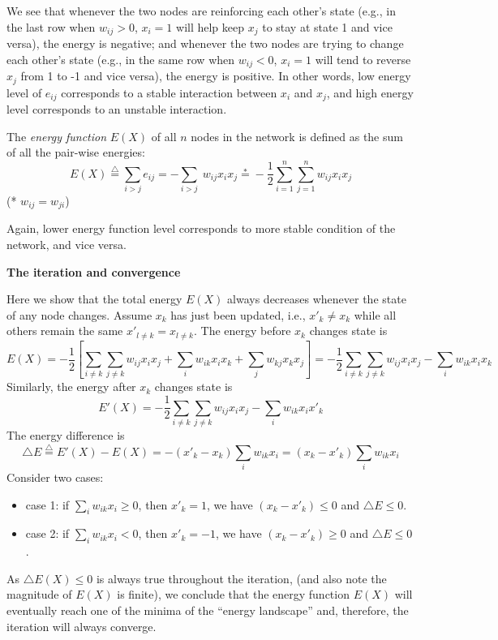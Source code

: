 We see that whenever the two nodes are reinforcing each other's state (e.g.,
in the last row when $w_{ij}>0$, $x_i=1$ will help keep $x_j$ to stay at state
1 and vice versa), the energy is negative; and whenever the two nodes are 
trying to change each other's state (e.g., in the same row when $w_{ij}<0$, 
$x_i=1$ will tend to reverse $x_j$ from 1 to -1 and vice versa), the energy is
positive. In other words, low energy level of $e_{ij}$ corresponds to a stable
interaction between $x_i$ and $x_j$, and high energy level corresponds to an
unstable interaction.

The {\em energy function} $E(X)$ of all $n$ nodes in the network is defined as
the sum of all the pair-wise energies:
\[
E(X) \stackrel{\triangle}{=} \sum_{i>j} e_{ij}=-\sum_{i>j} \; w_{ij}x_ix_j
	 \stackrel{*}{=} -\frac{1}{2}\sum_{i=1}^{n} \sum_{j=1}^{n} w_{ij} x_i x_j 
\]
(* $w_{ij}=w_{ji}$)

Again, lower energy function level corresponds to more stable condition of 
the network, and vice versa.

{\bf The iteration and convergence}

Here we show that the total energy $E(X)$ always decreases whenever the state 
of any node changes. Assume $x_k$ has just been updated, i.e., $x'_k \neq x_k$ 
while all others remain the same $x'_{l \neq k} = x_{l \neq k}$. The energy 
before $x_k$ changes state is
\[ 
E(X)	= -\frac{1}{2}[ \sum_{i\neq k}\sum_{j\neq k}w_{ij}x_ix_j
	+ \sum_i w_{ik}x_ix_k + \sum_j w_{kj}x_kx_j ]
	= -\frac{1}{2} \sum_{i\neq k}\sum_{j\neq k}w_{ij}x_ix_j
	- \sum_i w_{ik}x_ix_k 
\]
Similarly, the energy after $x_k$ changes state is
\[	E'(X)= -\frac{1}{2} \sum_{i\neq k}\sum_{j\neq k}w_{ij}x_ix_j
	- \sum_i w_{ik}x_ix'_k 
\]
The energy difference is
\[	\bigtriangleup E\stackrel{\triangle}{=}E'(X)-E(X)
	=-(x'_k-x_k) \sum_i w_{ik}x_i=(x_k-x'_k) \sum_i w_{ik}x_i
\]
Consider two cases:
\begin{itemize}
\item	case 1:  if $\sum_i w_{ik}x_i \geq 0$, then $x'_k=1$, we have 
	$(x_k-x'_k) \le 0$ and $\bigtriangleup E \leq 0$.
\item	case 2:  if $\sum_i w_{ik}x_i < 0$, then $x'_k=-1$, we have 
	$(x_k-x'_k) \ge 0$ and $\bigtriangleup E \leq 0$.
\end{itemize}
As $\bigtriangleup E(X) \leq 0$ is always true throughout the iteration,
(and also note the magnitude of $E(X)$ is finite), we conclude that the energy 
function $E(X)$ will eventually reach one of the minima of the ``energy 
landscape'' and, therefore, the iteration will always converge.

